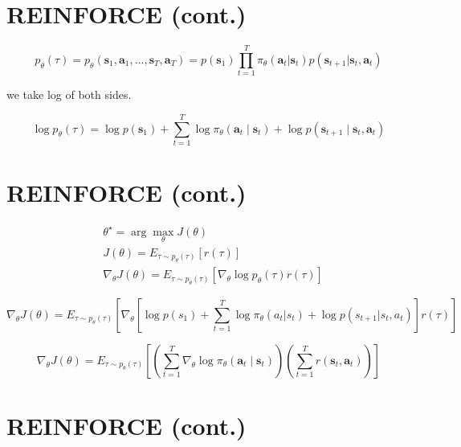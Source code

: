 \documentclass{article}
\begin{document}
\section*{REINFORCE (cont.)}

\begin{equation}
p_{\theta}(\tau) = p_{\theta}(\mathbf{s}_{1},\mathbf{a}_{1},...,\mathbf{s}_{T},\mathbf{a}_{T})=p(\mathbf{s}_{1})\prod_{t=1}^{T}\pi_{\theta}(\mathbf{a}_{t}|\mathbf{s}_{t})p(\mathbf{s}_{t+1}|\mathbf{s}_{t},\mathbf{a}_{t})
\end{equation}

we take log of both sides. 

\begin{equation}
\log p_{\theta}(\tau) = \log p(\mathbf{s}_{1}) + \sum_{t=1}^{T} \log \pi_{\theta}(\mathbf{a}_{t} \mid \mathbf{s}_{t}) + \log p(\mathbf{s}_{t+1} \mid \mathbf{s}_{t}, \mathbf{a}_{t})
\end{equation}

\section*{REINFORCE (cont.)}

\begin{align}
& \theta^{\star} = \arg \max_{\theta} J(\theta) \\
& J(\theta) = E_{\tau \sim p_{\theta}(\tau)} [r(\tau)] \\
& \nabla_{\theta} J(\theta) = E_{\tau \sim p_{\theta}(\tau)} \left[ \nabla_{\theta} \log p_{\theta}(\tau) r(\tau) \right]
\end{align}

\begin{equation}
    \nabla_{\theta} J(\theta) = E_{\tau \sim p_{\theta}(\tau)} \left[ \nabla_{\theta}\left[\log p(s_{1})+\sum_{t=1}^{T}\log \pi_{\theta}(a_{t}|s_{t})+\log p(s_{t+1}|s_{t},a_{t})\right] r(\tau) \right]
\end{equation}

\begin{equation}
\nabla_{\theta} J(\theta) = E_{\tau \sim p_{\theta}(\tau)} \left[ \left( \sum_{t=1}^{T} \nabla_{\theta} \log \pi_{\theta}(\mathbf{a}_{t} \mid \mathbf{s}_{t}) \right) \left( \sum_{t=1}^{T} r(\mathbf{s}_{t}, \mathbf{a}_{t}) \right) \right]
\end{equation}

\section*{REINFORCE (cont.)}
\end{document}
